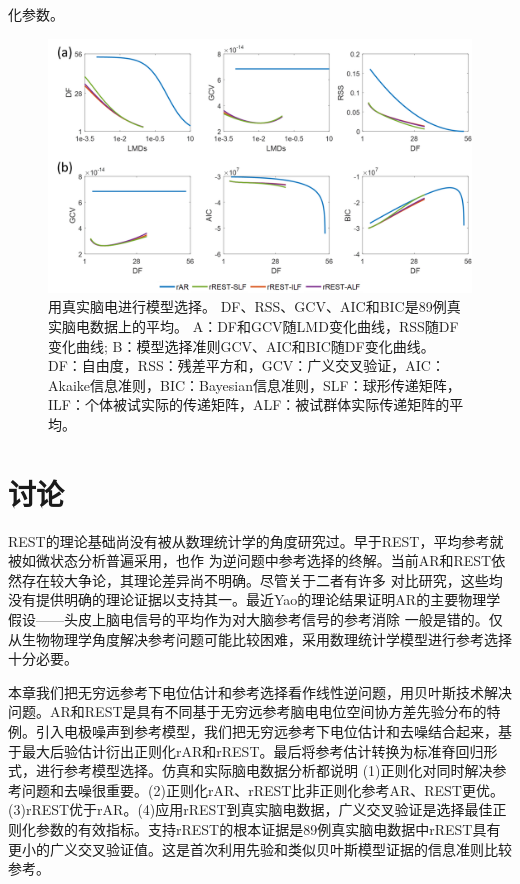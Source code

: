 化参数。
\begin{figure}[!h]
	\centering
	\includegraphics[width=15cm]{pic/Frontier/figure8.png}
	\caption{用真实脑电进行模型选择。 DF、RSS、GCV、AIC和BIC是89例真实脑电数据上的平均。 A：DF和GCV随LMD变化曲线，RSS随DF变化曲线; B：模型选择准则GCV、AIC和BIC随DF变化曲线。 DF：自由度，RSS：残差平方和，GCV：广义交叉验证，AIC：Akaike信息准则，BIC：Bayesian信息准则，SLF：球形传递矩阵，ILF：个体被试实际的传递矩阵，ALF：被试群体实际传递矩阵的平均。}
	\label{3.8}
\end{figure}

\section{讨论}
REST的理论基础尚没有被从数理统计学的角度研究过。早于REST，平均参考就被如微状态分析普遍采用，也作
为逆问题中参考选择的终解。当前AR和REST依然存在较大争论，其理论差异尚不明确。尽管关于二者有许多
对比研究，这些均没有提供明确的理论证据以支持其一。最近Yao的理论结果证明AR的主要物理学假设——头皮上脑电信号的平均作为对大脑参考信号的参考消除
一般是错的。仅从生物物理学角度解决参考问题可能比较困难，采用数理统计学模型进行参考选择十分必要。

本章我们把无穷远参考下电位估计和参考选择看作线性逆问题，用贝叶斯技术解决问题。AR和REST是具有不同基于无穷远参考脑电电位空间协方差先验分布的特例。引入电极噪声到参考模型，我们把无穷远参考下电位估计和去噪结合起来，基于最大后验估计衍出正则化rAR和rREST。最后将参考估计转换为标准脊回归形式，进行参考模型选择。仿真和实际脑电数据分析都说明 (1)正则化对同时解决参考问题和去噪很重要。(2)正则化rAR、rREST比非正则化参考AR、REST更优。(3)rREST优于rAR。(4)应用rREST到真实脑电数据，广义交叉验证是选择最佳正则化参数的有效指标。支持rREST的根本证据是89例真实脑电数据中rREST具有更小的广义交叉验证值。这是首次利用先验和类似贝叶斯模型证据的信息准则比较参考。

